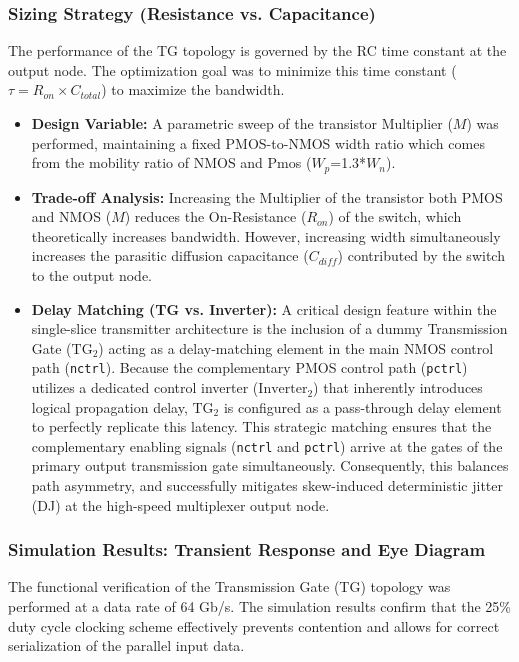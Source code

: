 \subsubsection*{Sizing Strategy (Resistance vs. Capacitance)}
The performance of the TG topology is governed by the RC time constant at the output node. The optimization goal was to minimize this time constant ($\tau = R_{on} \times C_{total}$) to maximize the bandwidth.
\begin{itemize}
    \item \textbf{Design Variable:} A parametric sweep of the transistor Multiplier ($M$) was performed, maintaining a fixed PMOS-to-NMOS width ratio which comes from the mobility ratio of NMOS and Pmos ($W_p$=1.3*$W_n$).
    \item \textbf{Trade-off Analysis:} Increasing the Multiplier of the transistor both PMOS and NMOS ($M$) reduces the On-Resistance ($R_{on}$) of the switch, which theoretically increases bandwidth. However, increasing width simultaneously increases the parasitic diffusion capacitance ($C_{diff}$) contributed by the switch to the output node.
    
    \item \textbf{Delay Matching (TG vs. Inverter):} A critical design feature within the single-slice transmitter architecture is the inclusion of a dummy Transmission Gate ($\text{TG}_2$) acting as a delay-matching element in the main NMOS control path (\texttt{nctrl}). Because the complementary PMOS control path (\texttt{pctrl}) utilizes a dedicated control inverter ($\text{Inverter}_2$) that inherently introduces logical propagation delay, $\text{TG}_2$ is configured as a pass-through delay element to perfectly replicate this latency. This strategic matching ensures that the complementary enabling signals (\texttt{nctrl} and \texttt{pctrl}) arrive at the gates of the primary output transmission gate simultaneously. Consequently, this balances path asymmetry, and successfully mitigates skew-induced deterministic jitter (DJ) at the high-speed multiplexer output node.
\end{itemize}


\subsubsection*{Simulation Results: Transient Response and Eye Diagram}
The functional verification of the Transmission Gate (TG) topology was performed at a data rate of 64 Gb/s. The simulation results confirm that the 25\% duty cycle clocking scheme effectively prevents contention and allows for correct serialization of the parallel input data.

